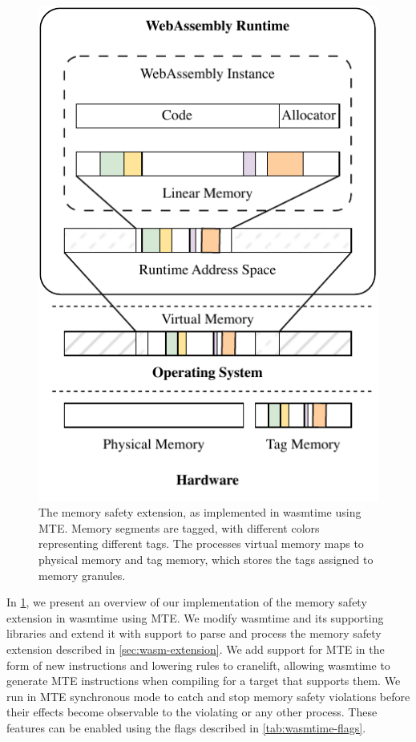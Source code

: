 \begin{figure}[t]
    \centering
    \includegraphics[scale=1]{figures/build/system-design-2}
    \caption{The memory safety extension, as implemented in wasmtime using \ac{MTE}. Memory segments are tagged, with different colors representing different tags. The processes virtual memory maps to physical memory and tag memory, which stores the tags assigned to memory granules.}
    \label{fig:wasmtime-mte-impl}
\end{figure}

In \cref{fig:wasmtime-mte-impl}, we present an overview of our implementation of the memory safety extension in wasmtime using \ac{MTE}.
We modify wasmtime and its supporting libraries and extend it with support to parse and process the memory safety extension described in \cref{sec:wasm-extension}.
We add support for \ac{MTE} in the form of new instructions and lowering rules to cranelift, allowing wasmtime to generate \ac{MTE} instructions when compiling for a target that supports them.
We run in \ac{MTE} synchronous mode to catch and stop memory safety violations before their effects become observable to the violating or any other process.
These features can be enabled using the flags described in \cref{tab:wasmtime-flags}.

